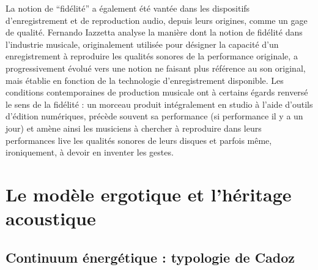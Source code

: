 \noindent La notion de ``fidélité'' a également été vantée dans les dispositifs d'enregistrement et de reproduction audio, depuis leurs origines, comme un gage de qualité. Fernando Iazzetta \cite{iazzetta_meaning_2000} analyse la manière dont la notion de fidélité dans l'industrie musicale, originalement utilisée pour désigner la capacité d'un enregistrement à reproduire les qualités sonores de la performance originale, a progressivement évolué vers une notion ne faisant plus référence au son original, mais établie en fonction de la technologie d'enregistrement disponible. Les conditions contemporaines de production musicale ont à certains égards renversé le sens de la fidélité : un morceau produit intégralement en studio à l'aide d'outils d'édition numériques, précède souvent sa performance (si performance il y a un jour) et amène ainsi les musiciens à chercher à reproduire dans leurs performances live les qualités sonores de leurs disques et parfois même, ironiquement, à devoir en inventer les gestes.


\section{Le modèle ergotique et l'héritage acoustique}
\label{sec:gesture:ergotic}

\subsection{Continuum énergétique : typologie de Cadoz}

